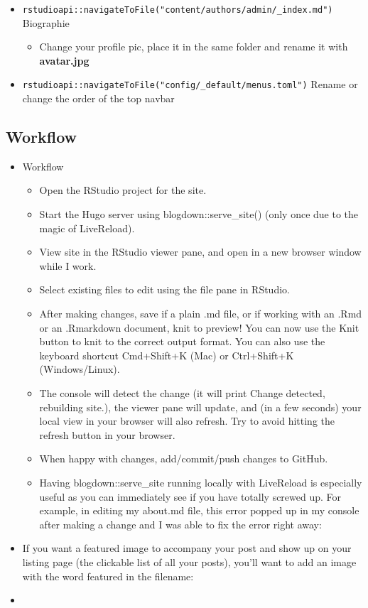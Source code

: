 \documentclass[
]{article}
\providecommand{\tightlist}{%
  \setlength{\itemsep}{0pt}\setlength{\parskip}{0pt}}
\begin{document}
\begin{itemize}
\item
  \texttt{rstudioapi::navigateToFile("content/authors/admin/\_index.md")}
  Biographie

  \begin{itemize}
  \tightlist
  \item
    Change your profile pic, place it in the same folder and rename
    it with \textbf{avatar.jpg}
  \end{itemize}
\item
  \texttt{rstudioapi::navigateToFile("config/\_default/menus.toml")} Rename or
  change the order of the top navbar
\end{itemize}

\hypertarget{workflow-1}{%
\subsection{Workflow}\label{workflow-1}}

\begin{itemize}
\item
  Workflow

  \begin{itemize}
  \tightlist
  \item
    Open the RStudio project for the site.
  \item
    Start the Hugo server using blogdown::serve\_site() (only once
    due to the magic of LiveReload).
  \item
    View site in the RStudio viewer pane, and open in a new browser
    window while I work.
  \item
    Select existing files to edit using the file pane in RStudio.
  \item
    After making changes, save if a plain .md file, or if working
    with an .Rmd or an .Rmarkdown document, knit to preview! You can
    now use the Knit button to knit to the correct output format.
    You can also use the keyboard shortcut Cmd+Shift+K (Mac) or
    Ctrl+Shift+K (Windows/Linux).
  \item
    The console will detect the change (it will print Change
    detected, rebuilding site.), the viewer pane will update, and
    (in a few seconds) your local view in your browser will also
    refresh. Try to avoid hitting the refresh button in your
    browser.
  \item
    When happy with changes, add/commit/push changes to GitHub.
  \item
    Having blogdown::serve\_site running locally with LiveReload is
    especially useful as you can immediately see if you have totally
    screwed up. For example, in editing my about.md file, this error
    popped up in my console after making a change and I was able to
    fix the error right away:
  \end{itemize}
\item
  If you want a featured image to accompany your post and show up on
  your listing page (the clickable list of all your posts), you'll
  want to add an image with the word featured in the filename:
\item
\end{itemize}
\end{document}
